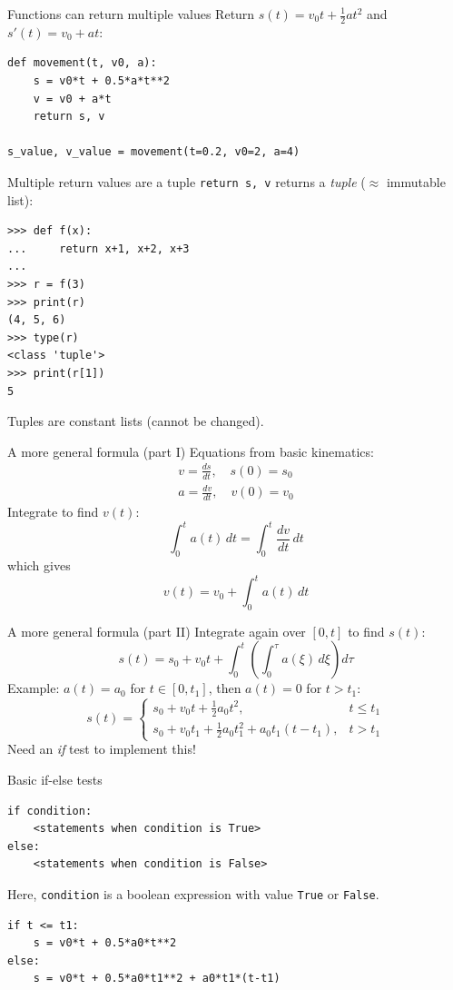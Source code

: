 \begin{frame}[fragile]{Functions can return multiple values}
  Return $s(t)=v_0t+\frac{1}{2}at^2$ and $s'(t)=v_0 + at$:
\begin{lstlisting}[style=pythoncompact]
def movement(t, v0, a):
    s = v0*t + 0.5*a*t**2
    v = v0 + a*t
    return s, v

s_value, v_value = movement(t=0.2, v0=2, a=4)
\end{lstlisting}
\end{frame}

\begin{frame}[fragile]{Multiple return values are a tuple}
  \texttt{return s, v} returns a \emph{tuple} ($\approx$ immutable list):
\begin{lstlisting}[style=pythonTiny]
>>> def f(x):
...     return x+1, x+2, x+3
...
>>> r = f(3)
>>> print(r)
(4, 5, 6)
>>> type(r)
<class 'tuple'>
>>> print(r[1])
5
\end{lstlisting}
  Tuples are constant lists (cannot be changed).
\end{frame}

\begin{frame}{A more general formula (part I)}
  Equations from basic kinematics:
  \begin{align*}
    v = \frac{ds}{dt},\quad s(0)=s_0\\
    a = \frac{dv}{dt},\quad v(0)=v_0
  \end{align*}
  Integrate to find $v(t)$:
  \[
    \int_0^t a(t)\,dt = \int_0^t \frac{dv}{dt}\,dt
  \]
  which gives
  \[
    v(t) = v_0 + \int_0^t a(t)\,dt
  \]
\end{frame}

\begin{frame}{A more general formula (part II)}
  Integrate again over $[0,t]$ to find $s(t)$:
  \[
    s(t) = s_0 + v_0 t + \int_0^t\left( \int_0^\tau a(\xi)\,d\xi \right) d\tau
  \]
  Example: $a(t)=a_0$ for $t\in[0,t_1]$, then $a(t)=0$ for $t>t_1$:
  \[
  s(t) =
  \begin{cases}
  s_0 + v_0 t + \tfrac12 a_0 t^2, & t\leq t_1\\[0.5em]
  s_0 + v_0 t_1 + \tfrac12 a_0 t_1^2 + a_0 t_1(t-t_1), & t> t_1
  \end{cases}
  \]
  Need an \emph{if} test to implement this!
\end{frame}

\begin{frame}[fragile]{Basic if-else tests}
\begin{lstlisting}[style=pythoncompact]
if condition:
    <statements when condition is True>
else:
    <statements when condition is False>
\end{lstlisting}
  Here, \texttt{condition} is a boolean expression with value
  \texttt{True} or \texttt{False}.
\begin{lstlisting}[style=pythoncompact]
if t <= t1:
    s = v0*t + 0.5*a0*t**2
else:
    s = v0*t + 0.5*a0*t1**2 + a0*t1*(t-t1)
\end{lstlisting}
\end{frame}


